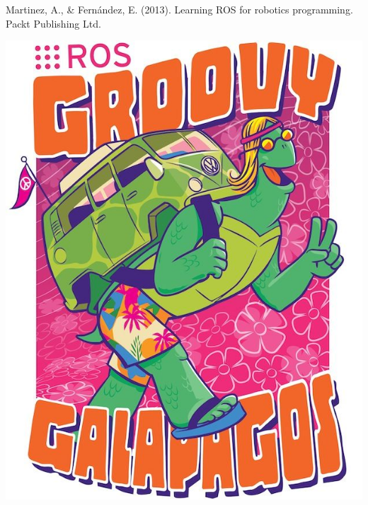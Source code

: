 \documentclass[11pt,a4paper]{article}
\begin{document}
Martinez, A., & Fernández, E. (2013). Learning ROS for robotics programming. Packt Publishing Ltd.

\begin{center}
 \includegraphics[scale=2]{EV1/7.jpg}
 \end{center} 
\end{document}
